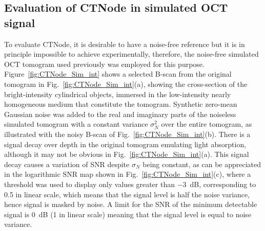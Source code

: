 \subsection{Evaluation of CTNode in simulated OCT signal}

To evaluate CTNode, it is desirable to have a noise-free reference but it is in principle impossible to achieve experimentally, therefore, the noise-free simulated OCT tomogram used previously was employed for this purpose. Figure~\ref{fig:CTNode_Sim_int} shows a selected B-scan from the original tomogram in Fig.~\ref{fig:CTNode_Sim_int}(a), showing the cross-section of the bright-intensity cylindrical objects, immersed in the low-intensity nearly homogeneous medium that constitute the tomogram. Synthetic zero-mean Gaussian noise was added to the real and imaginary parts of the noiseless simulated tomogram with a constant variance $\sigma_N^2$ over the entire tomogram, as illustrated with the noisy B-scan of Fig.~\ref{fig:CTNode_Sim_int}(b). There is a signal decay over depth in the original tomogram emulating light absorption, although it may not be obvious in Fig.~\ref{fig:CTNode_Sim_int}(a). This signal decay causes a variation of SNR despite $\sigma_N$ being constant, as can be appreciated in the logarithmic SNR map shown in Fig.~\ref{fig:CTNode_Sim_int}(c), where a threshold was used to display only values greater than $-3$~dB, corresponding to 0.5 in linear scale, which means that the signal level is half the noise variance, hence signal is masked by noise. A limit for the SNR of the minimum detectable signal is 0~dB (1 in linear scale) meaning that the signal level is equal to noise variance.

